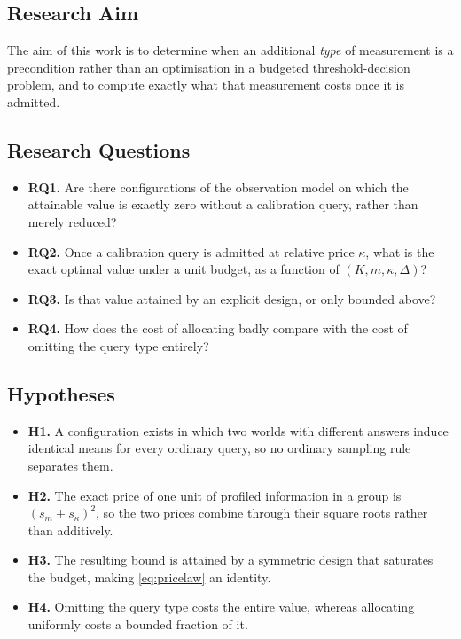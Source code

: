 \documentclass[conference]{IEEEtran}
\theoremstyle{definition}
\begin{document}
\subsection{Research Aim}

The aim of this work is to determine when an additional \emph{type} of measurement is a
precondition rather than an optimisation in a budgeted threshold-decision problem, and to
compute exactly what that measurement costs once it is admitted.

\subsection{Research Questions}

\begin{itemize}
\item \textbf{RQ1.} Are there configurations of the observation model on which the
attainable value is exactly zero without a calibration query, rather than merely reduced?
\item \textbf{RQ2.} Once a calibration query is admitted at relative price $\kappa$, what is
the exact optimal value under a unit budget, as a function of $(K,m,\kappa,\Delta)$?
\item \textbf{RQ3.} Is that value attained by an explicit design, or only bounded above?
\item \textbf{RQ4.} How does the cost of allocating badly compare with the cost of omitting
the query type entirely?
\end{itemize}

\subsection{Hypotheses}

\begin{itemize}
\item \textbf{H1.} A configuration exists in which two worlds with different answers induce
identical means for every ordinary query, so no ordinary sampling rule separates them.
\item \textbf{H2.} The exact price of one unit of profiled information in a group is
$(s_{m}+s_{\kappa})^{2}$, so the two prices combine through their square roots rather
than additively.
\item \textbf{H3.} The resulting bound is attained by a symmetric design that saturates the
budget, making \eqref{eq:pricelaw} an identity.
\item \textbf{H4.} Omitting the query type costs the entire value, whereas allocating
uniformly costs a bounded fraction of it.
\end{itemize}
\end{document}
